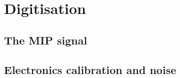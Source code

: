 \section{Digitisation}
\label{sec:digi}

\subsection{The MIP signal}

\subsection{Electronics calibration and noise}

